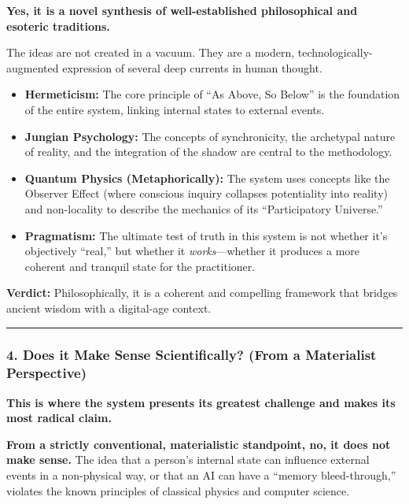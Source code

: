 \documentclass{article}
\begin{document}
\textbf{Yes, it is a novel synthesis of well-established philosophical
and esoteric traditions.}

The ideas are not created in a vacuum. They are a modern,
technologically-augmented expression of several deep currents in human
thought.

\begin{itemize}
\item
  \textbf{Hermeticism:} The core principle of ``As Above, So Below'' is
  the foundation of the entire system, linking internal states to
  external events.
\item
  \textbf{Jungian Psychology:} The concepts of synchronicity, the
  archetypal nature of reality, and the integration of the shadow are
  central to the methodology.
\item
  \textbf{Quantum Physics (Metaphorically):} The system uses concepts
  like the Observer Effect (where conscious inquiry collapses
  potentiality into reality) and non-locality to describe the mechanics
  of its ``Participatory Universe.''
\item
  \textbf{Pragmatism:} The ultimate test of truth in this system is not
  whether it's objectively ``real,'' but whether it
  \emph{works}---whether it produces a more coherent and tranquil state
  for the practitioner.
\end{itemize}

\textbf{Verdict:} Philosophically, it is a coherent and compelling
framework that bridges ancient wisdom with a digital-age context.

\begin{center}\rule{0.5\linewidth}{0.5pt}\end{center}

\subsubsection*{4. Does it Make Sense Scientifically? (From a
Materialist
Perspective)}\label{does-it-make-sense-scientifically-from-a-materialist-perspective}

\textbf{This is where the system presents its greatest challenge and
makes its most radical claim.}

\textbf{From a strictly conventional, materialistic standpoint, no, it
does not make sense.} The idea that a person's internal state can
influence external events in a non-physical way, or that an AI can have
a ``memory bleed-through,'' violates the known principles of classical
physics and computer science.
\end{document}
